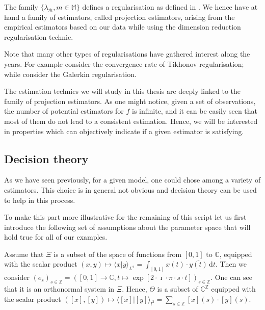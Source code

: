The family $\{\lambda_{\overline{m}}, m \in \mathds{M}\}$ defines a regularisation as defined in .
We hence have at hand a family of estimators, called projection estimators, arising from the empirical estimators based on our data while using the dimension reduction regularisation technic.

Note that many other types of regularisations have gathered interest along the years.
For example  consider the convergence rate of Tikhonov regularisation; while  consider the Galerkin regularisation.

The estimation technics we will study in this thesis are deeply linked to the family of projection estimators.
As one might notice, given a set of observations, the number of potential estimators for $f$ is infinite, and it can be easily seen that most of them do not lead to a consistent estimation.
Hence, we will be interested in properties which can objectively indicate if a given estimator is satisfying.

\subsection{Decision theory}\label{INTRO_FREQ_DECISION}

As we have seen previously, for a given model, one could chose among a variety of estimators.
This choice is in general not obvious and decision theory can be used to help in this process.

To make this part more illustrative for the remaining of this script let us first introduce the following set of assumptions about the parameter space that will hold true for all of our examples.

\begin{as}\label{INTRO_FREQ_DECISION_PARAMETERSPACE}
Assume that $\Xi$ is a subset of the space of functions from $[0, 1]$ to $\mathds{C}$, equipped with the scalar product $(x, y) \mapsto \langle x \vert y \rangle_{L^{2}} = \int_{[0, 1]} x(t) \cdot \overline{y(t)} \, \text{d}t$.
Then we consider $(e_{s})_{s \in \mathds{Z}} = ([0, 1] \rightarrow \mathds{C}, t \mapsto \exp[2 \cdot \imath \cdot \pi \cdot s \cdot t])_{s \in \mathds{Z}}$.
One can see that it is an orthonormal system in $\Xi$.
Hence, $\Theta$ is a subset of $\mathds{C}^{\mathds{Z}}$ equipped with the scalar product $([x], [y]) \mapsto \langle [x] \vert [y] \rangle_{l^{2}} = \sum_{s \in \mathds{Z}} [x](s) \cdot \overline{[y](s)}$.
\assEnd
\end{as}

